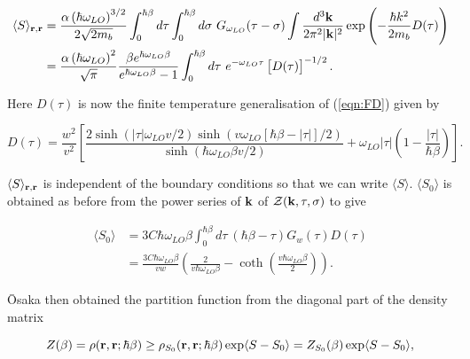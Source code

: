 \begin{equation}
    \begin{aligned}
        \langle S \rangle_{\vb{r}, \vb{r}} &= \frac{\alpha \left(\hbar \omega_{LO}\right)^{3/2}}{2\sqrt{2 m_b}} \int^{\hbar\beta}_0 d\tau \int^{\hbar\beta}_0 d\sigma\ G_{\omega_{LO}}(\tau - \sigma) \int \frac{d^3\vb{k}}{2\pi^2|\vb{k}|^2} \exp \left(-\frac{\hbar k^2}{2m_b} D(\tau)\right) \\
        &= \frac{\alpha \left( \hbar \omega_{LO}\right)^{2}}{\sqrt{\pi}} \frac{\beta e^{\hbar\omega_{LO}\beta}}{e^{\hbar\omega_{LO}\beta} - 1} \int^{\hbar\beta}_0 d\tau\ e^{-\omega_{LO}\tau} \left[D(\tau) \right]^{-1/2}.
    \end{aligned}
\end{equation}

Here $D(\tau)$ is now the finite temperature generalisation of (\ref{eqn:FD}) given by

\begin{equation}
    D(\tau) = \frac{w^2}{v^2} \left[ \frac{2\sinh(|\tau|\omega_{LO} v/2) \sinh(v \omega_{LO}[\hbar\beta - |\tau|] / 2)}{\sinh(\hbar\omega_{LO}\beta v /2)} + \omega_{LO}|\tau| \left(1 - \frac{|\tau|}{\hbar\beta}\right)\right].
\end{equation}

$ \langle S \rangle_{\vb{r}, \vb{r}}$ is independent of the boundary conditions so that we can write $\langle S \rangle$. $\langle S_0 \rangle$ is obtained as before from the power series of $\vb{k}$ of $\mathcal{Z}(\vb{k}, \tau, \sigma)$ to give

\begin{equation}
    \begin{aligned}
        \langle S_0 \rangle &= 3C\hbar\omega_{LO}\beta \int^{\hbar\beta}_0 d\tau\ (\hbar\beta - \tau) G_w(\tau) D(\tau) \\
        &= \frac{3C \hbar \omega_{LO} \beta}{vw} \left(\frac{2}{v\hbar\omega_{LO}\beta} - \coth\left(\frac{v\hbar\omega_{LO}\beta}{2}\right) \right).
    \end{aligned}
\end{equation}

\=Osaka then obtained the partition function from the diagonal part of the density matrix

\begin{equation}
    Z(\beta) = \rho(\vb{r}, \vb{r}; \hbar\beta) \geq \rho_{S_0}(\vb{r}, \vb{r}; \hbar\beta) \exp\langle S - S_0 \rangle = Z_{S_0}(\beta) \exp\langle S - S_0 \rangle,
\end{equation}

